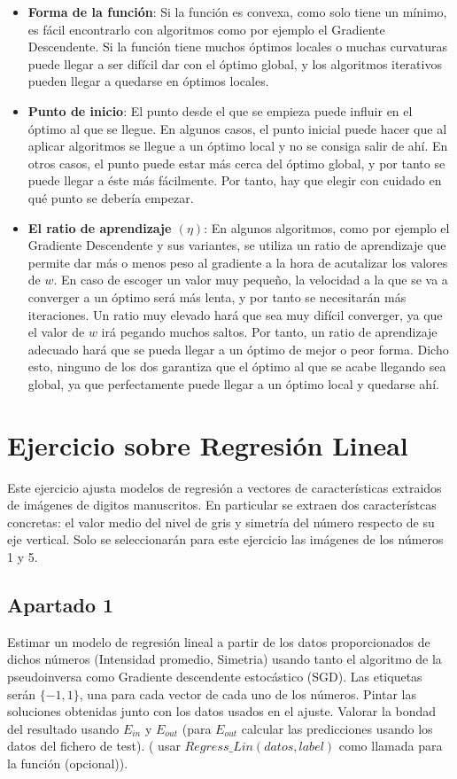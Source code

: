 \documentclass[11pt,a4paper]{article}
\begin{document}
\begin{itemize}[label=\textbullet]
	\item \textbf{Forma de la función}: Si la función es convexa, como solo tiene un mínimo, es fácil encontrarlo con
	algoritmos como por ejemplo el Gradiente Descendente. Si la función tiene muchos óptimos locales o muchas curvaturas
	puede llegar a ser difícil dar con el óptimo global, y los algoritmos iterativos pueden llegar a quedarse en óptimos
	locales.
	\item \textbf{Punto de inicio}: El punto desde el que se empieza puede influir en el óptimo al que se llegue. En algunos
	casos, el punto inicial puede hacer que al aplicar algoritmos se llegue a un óptimo local y no se consiga salir de ahí.
	En otros casos, el punto puede estar más cerca del óptimo global, y por tanto se puede llegar a éste más fácilmente. Por
	tanto, hay que elegir con cuidado en qué punto se debería empezar.
	\item \textbf{El ratio de aprendizaje $(\eta)$}: En algunos algoritmos, como por ejemplo el Gradiente Descendente y sus
	variantes, se utiliza un ratio de aprendizaje que permite dar más o menos peso al gradiente a la hora de acutalizar los
	valores de $w$. En caso de escoger un valor muy pequeño, la velocidad a la que se va a converger a un óptimo será más
	lenta, y por tanto se necesitarán más iteraciones. Un ratio muy elevado hará que sea muy difícil converger, ya que el
	valor de $w$ irá pegando muchos saltos. Por tanto, un ratio de aprendizaje adecuado hará que se pueda llegar a un óptimo
	de mejor o peor forma. Dicho esto, ninguno de los dos garantiza que el óptimo al que se acabe llegando sea global, ya
	que perfectamente puede llegar a un óptimo local y quedarse ahí.
\end{itemize}

\section{Ejercicio sobre Regresión Lineal}

Este ejercicio ajusta modelos de regresión a vectores de características extraidos de imágenes de digitos manuscritos. En
particular se extraen dos característcas concretas: el valor medio del nivel de gris y simetría del número respecto de su eje
vertical. Solo se seleccionarán para este ejercicio las imágenes de los números 1 y 5.

\subsection*{Apartado 1}
Estimar un modelo de regresión lineal a partir de los datos proporcionados de dichos números (Intensidad promedio, Simetria)
usando tanto el algoritmo de la pseudoinversa como Gradiente descendente estocástico (SGD). Las etiquetas serán
$ \lbrace -1, 1 \rbrace $, una para cada vector de cada uno de los números. Pintar las soluciones obtenidas junto con los
datos usados en el ajuste. Valorar la bondad del resultado usando $E_{in}$ y $E_{out}$ (para $E_{out}$ calcular las
predicciones usando los datos del fichero de test). ( usar $Regress\_Lin(datos, label)$ como llamada para la función
(opcional)).\\
\end{document}
